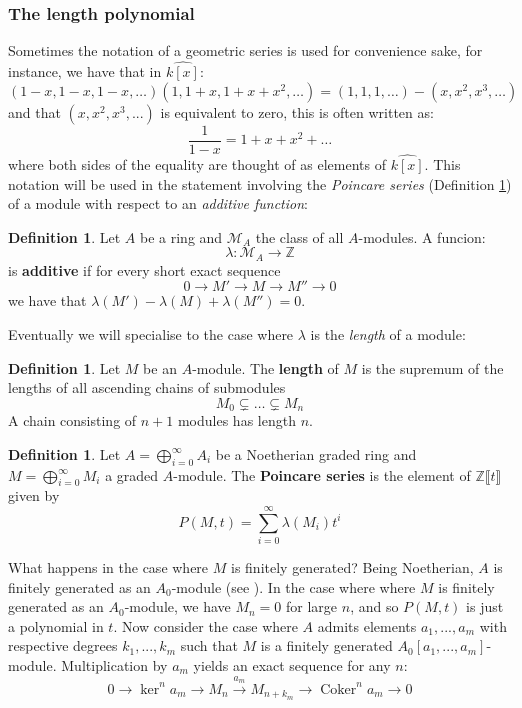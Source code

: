 \documentclass[12pt]{article}
\theoremstyle{plain}
\theoremstyle{definition}
\newtheorem{defn}[thm]{Definition} %
\newcommand{\bb}[1]{\mathbb{#1}}
\newcommand{\call}[1]{\mathcal{#1}}
\newcommand{\lto}{\longrightarrow}
\begin{document}
	\subsubsection{The length polynomial}
	Sometimes the notation of a geometric series is used for convenience sake, for instance, we have that in $\widehat{k[x]}$:
	\[(1-x,1-x,1-x,\hdots)(1,1+x,1+x+x^2,\hdots) = (1,1,1,\hdots) - (x,x^2,x^3,\hdots)\]
	and that $(x,x^2,x^3,...)$ is equivalent to zero, this is often written as:
	\[\frac{1}{1-x} = 1 + x + x^2 + \hdots\]
	where both sides of the equality are thought of as elements of $\widehat{k[x]}$. This notation will be used in the statement involving the \emph{Poincare series} (Definition \ref{def:poincare}) of a module with respect to an \emph{additive function}:
	\begin{defn}
		\label{def:length}
		Let $A$ be a ring and $\call{M}_A$ the class of all $A$-modules. A funcion:
		\[\lambda: \call{M}_A \lto \bb{Z}\]
		is \textbf{additive} if for every short exact sequence
		\[0 \lto M' \lto M \lto M'' \lto 0\]
		we have that $\lambda(M') - \lambda(M) + \lambda(M'') = 0$.
	\end{defn}
	Eventually we will specialise to the case where $\lambda$ is the \emph{length} of a module:
	\begin{defn}
		Let $M$ be an $A$-module. The \textbf{length} of $M$ is the supremum of the lengths of all ascending chains of submodules
		\[M_0 \subsetneq \hdots \subsetneq M_n\]
		A chain consisting of $n+1$ modules has length $n$.
	\end{defn}
	\begin{defn}
		\label{def:poincare} Let $A = \bigoplus_{i = 0}^\infty A_i$ be a Noetherian graded ring and $M = \bigoplus_{i = 0}^\infty M_i$ a graded $A$-module. The \textbf{Poincare series} is the element of $\bb{Z}\llbracket t \rrbracket$ given by
		\[P(M,t) = \sum_{i = 0}^\infty \lambda(M_i)t^i\]
	\end{defn}
	What happens in the case where $M$ is finitely generated? Being Noetherian, $A$ is finitely generated as an $A_0$-module (see \cite{com_alg_notes}). In the case where where $M$ is finitely generated as an $A_0$-module, we have $M_n = 0$ for large $n$, and so $P(M,t)$ is just a polynomial in $t$. Now consider the case where $A$ admits elements $a_1,...,a_m$ with respective degrees $k_1,...,k_m$ such that $M$ is a finitely generated $A_0[a_1,...,a_m]$-module. Multiplication by $a_m$ yields an exact sequence for any $n$:
	\begin{equation}
		\label{eq:mult_by_an}
		0 \lto \ker^n a_m \lto M_n \stackrel{a_m}{\lto} M_{n + k_m} \lto \operatorname{Coker}^n a_m \lto 0
	\end{equation}
\end{document}
